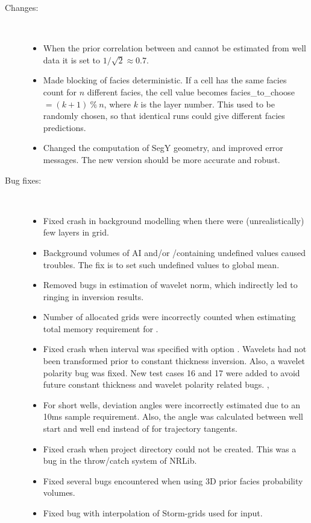 \begin{description}
\item [Changes:] \mbox{ }
  \begin{itemize}
    \item When the prior correlation between \vp and \vs cannot be
      estimated from well data it is set to $1/\sqrt{2}\approx
      0.7$. 
    \item Made blocking of facies deterministic. If a cell has the
      same facies count for $n$ different facies, the cell value
      becomes facies\_to\_choose $= (k + 1)\ \%\ n$, where $k$ is the
      layer number. This used to be randomly chosen, so that identical
      runs could give different facies predictions. 
    \item Changed the computation of SegY geometry, and improved error messages. The new version should be more accurate and robust.
  \end{itemize}

\item [Bug fixes:] \mbox{ }
  \begin{itemize}
    \item Fixed crash in background modelling when there were
      (unrealistically) few layers in grid. 
    \item Background volumes of AI and\!/\!or \vp/\vs containing undefined
      values caused troubles. The fix is to set such undefined values
      to global mean. 
    \item Removed bugs in estimation of wavelet norm, which indirectly
      led to ringing in inversion results. 
    \item Number of allocated grids were incorrectly counted when
      estimating total memory requirement for \crava. 
    \item Fixed crash when interval was specified with option
      . Wavelets had not been transformed
      prior to constant thickness inversion. Also, a wavelet polarity
      bug was fixed. New test cases 16 and 17 were added to avoid
      future constant thickness and wavelet polarity related
      bugs. , 
    \item For short wells, deviation angles were incorrectly estimated
      due to an 10ms sample requirement. Also, the angle was
      calculated between well start and well end instead of for
      trajectory tangents.
    \item Fixed crash when project directory could not be
      created. This was a bug in the throw/catch system of
      NRLib. 
    \item Fixed several bugs encountered when using 3D prior facies
      probability volumes. 
    \item Fixed bug with interpolation of Storm-grids used for input.
 \end{itemize}
\end{description}

